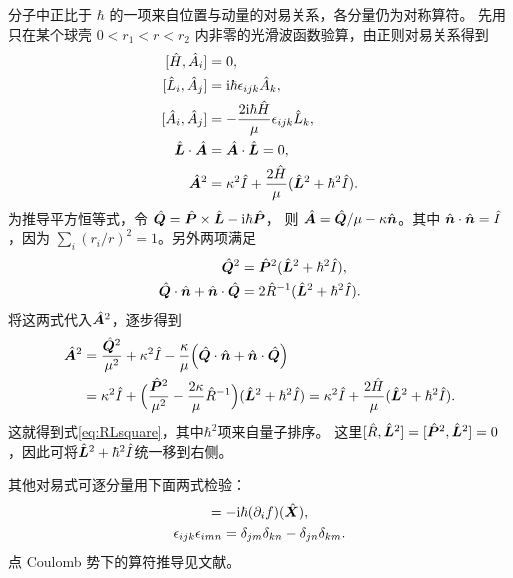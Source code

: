 分子中正比于 $\hbar$ 的一项来自位置与动量的对易关系，各分量仍为对称算符。
先用只在某个球壳 $0 < r_1 < r < r_2$ 内非零的光滑波函数验算，由正则对易关系得到
\begin{subequations}
    \begin{align}
        [\hat{H},\hat{A}_i] &= 0,\\
        {}[\hat{L}_i,\hat{A}_j] &= \mathrm{i}\hbar\epsilon_{ijk}\hat{A}_k,\\
        {}[\hat{A}_i,\hat{A}_j] &= -\frac{2\mathrm{i}\hbar \hat{H}}{\mu}\epsilon_{ijk}\hat{L}_k,\\
        \hat{\bm{L}} \cdot \hat{\bm{A}} &= \hat{\bm{A}} \cdot \hat{\bm{L}} = 0,\\
        \hat{\bm{A}}^2 &= \kappa^2\hat{I} + \frac{2\hat{H}}{\mu}(\hat{\bm{L}}^2 + \hbar^2\hat{I}).
        \label{eq:RLsquare}
    \end{align}
\end{subequations}
为推导平方恒等式，令 $\hat{\bm{Q}} = \hat{\bm{P}} \times \hat{\bm{L}} - \mathrm{i}\hbar\hat{\bm{P}}$，
则 $\hat{\bm{A}} = \hat{\bm{Q}}/\mu - \kappa\hat{\bm{n}}$。其中 $\hat{\bm{n}} \cdot \hat{\bm{n}} = \hat{I}$，因为 $\textstyle \sum_i(r_i/r)^2 = 1$。另外两项满足
\begin{subequations}
    \begin{align}
        \hat{\bm{Q}}^2 &= \hat{\bm{P}}^2(\hat{\bm{L}}^2 + \hbar^2\hat{I}),\\
        \hat{\bm{Q}} \cdot \hat{\bm{n}} + \hat{\bm{n}} \cdot \hat{\bm{Q}}
        &= 2\hat{R}^{-1}(\hat{\bm{L}}^2 + \hbar^2\hat{I}).
    \end{align}
\end{subequations}
将这两式代入$\hat{\bm{A}}^2$，逐步得到
\[
    \begin{alignedat}{1}
        \hat{\bm{A}}^2 &= \frac{\hat{\bm{Q}}^2}{\mu^2} + \kappa^2\hat{I}
            - \frac{\kappa}{\mu}
            \Bigl(\hat{\bm{Q}} \cdot \hat{\bm{n}} + \hat{\bm{n}} \cdot \hat{\bm{Q}}\Bigr)\\
        &= \kappa^2\hat{I} +
            \Bigl(\frac{\hat{\bm{P}}^2}{\mu^2} - \frac{2\kappa}{\mu}\hat{R}^{-1}\Bigr)
            (\hat{\bm{L}}^2 + \hbar^2\hat{I})
            = \kappa^2\hat{I} + \frac{2\hat{H}}{\mu}(\hat{\bm{L}}^2 + \hbar^2\hat{I}).
    \end{alignedat}
\]
这就得到式\eqref{eq:RLsquare}，其中$\hbar^2$项来自量子排序。
这里$[\hat{R},\hat{\bm{L}}^2] = [\hat{\bm{P}}^2,\hat{\bm{L}}^2] = 0$，因此可将$\hat{\bm{L}}^2 + \hbar^2\hat{I}$统一移到右侧。

其他对易式可逐分量用下面两式检验：
\begin{gather*}
    [\op{P}_i,f(\opbm{X})] = -\i\hbar(\p_i f)(\opbm{X}),\\
    \epsilon_{ijk}\epsilon_{imn} = \delta_{jm}\delta_{kn} - \delta_{jn}\delta_{km}.
\end{gather*}
点 Coulomb 势下的算符推导见文献\cite{runge}。

